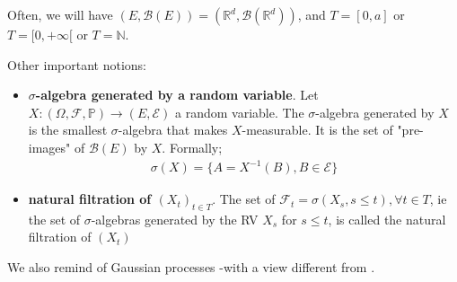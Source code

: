 Often, we will have $(E, \mathcal{B}(E)) = (\mathbb{R}^d, \mathcal{B}(\mathbb{R}^d))$, and $T = [0,a]$ or $T=[0, +\infty[$ or $T=\mathbb{N}$.

Other important notions:
\begin{itemize}
    \item \textbf{$\sigma$-algebra generated by a random variable}. Let $X : (\Omega, \mathcal{F}, \mathbb{P}) \rightarrow (E, \mathcal{E})$ a random variable. The $\sigma$-algebra generated by $X$ is the smallest $\sigma$-algebra that makes $X$-measurable. It is the set of "pre-images" of $\mathcal{B}(E)$ by $X$. Formally;
    \begin{align}
        \sigma(X) = \{ A = X^{-1}(B), B \in \mathcal{E} \}
    \end{align}
    \item \textbf{natural filtration of $(X_t)_{t \in T}$}. The set of $\mathcal{F}_t = \sigma(X_s, s \leq t), \forall t \in T$, ie the set of $\sigma$-algebras generated by the RV $X_s$ for $s \leq t$, is called the natural filtration of $(X_t)$
\end{itemize}



We also remind of Gaussian processes -with a view different from \cite{rasmussen_gaussian_2008}.



